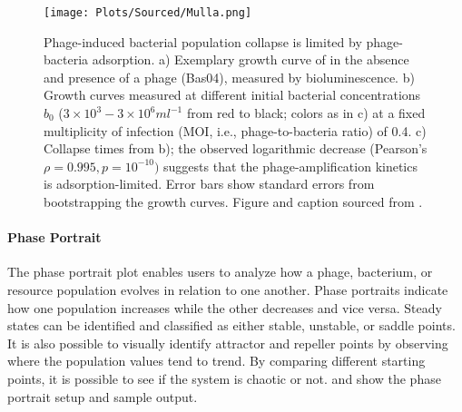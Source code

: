 \begin{figure}[]
    \texttt{[image: Plots/Sourced/Mulla.png]}
    \centering
    \caption{
        Phage-induced bacterial population collapse is limited by phage-bacteria adsorption. 
        a) Exemplary growth curve of  in the absence and presence of a phage (Bas04), measured by bioluminescence. 
        b) Growth curves measured at different initial bacterial concentrations $b_0$ ($3\times10^3 - 3\times 10^6 ml^{-1}$ from red to black; colors as in c) at a fixed multiplicity of infection (MOI, i.e., phage-to-bacteria ratio) of 0.4. 
        c) Collapse times from b); the observed logarithmic decrease (Pearson's $\rho=0.995, p=10^{-10})$ suggests that the phage-amplification kinetics is adsorption-limited. 
        Error bars show standard errors from bootstrapping the growth curves.
        Figure and caption sourced from \citet{mullaExtremeDiversityPhage2024}. 
    }
    \label{fig:sourced:Mulla}
\end{figure}

\paragraph{Phase Portrait}
\label{sec:phase_portrait}
The phase portrait plot enables users to analyze how a phage, bacterium, or resource population evolves in relation to one another.
Phase portraits indicate how one population increases while the other decreases and vice versa.
Steady states can be identified and classified as either stable, unstable, or saddle points. 
It is also possible to visually identify attractor and repeller points by observing where the population values tend to trend. 
By comparing different starting points, it is possible to see if the system is chaotic or not.
 and  show the phase portrait setup and sample output. 

